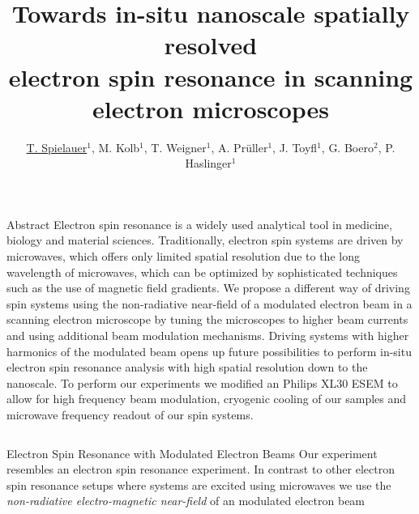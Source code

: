 \documentclass[final]{beamer}
\title{Towards in-situ nanoscale spatially resolved\hspace{1cm} \\ electron spin resonance in scanning electron microscopes}
\author{\underline{T. Spielauer$^{1}$}, M. Kolb$^{1}$, T. Weigner$^{1}$, A. Pr\"uller$^{1}$, J. Toyfl$^{1}$, G. Boero$^{2}$, P. Haslinger$^{1}$ }
\institute[]{
  {\small
  $^{1}$VCQ, Technische Universität Wien, Atominstitut, Stadionallee 2, 1020 Vienna, Austria; $^{2}$EPFL, BM 3110 Station 17, CH-1015 Lausanne, Switzerland
  }
}
\begin{document}
\begin{frame}[fragile]{}
  \begin{block}{\Large Abstract}
	Electron spin resonance is a widely used analytical tool in medicine, biology
	and material sciences. Traditionally, electron spin systems are driven by microwaves,
	which offers only limited spatial resolution due to the long wavelength of microwaves,
	which can be optimized by sophisticated techniques such as the use of magnetic
	field gradients. We propose a different way of driving spin systems using the
	non-radiative near-field of a modulated electron beam in a scanning electron microscope
	by tuning the microscopes to higher beam currents and using additional beam modulation
	mechanisms. Driving systems with higher harmonics of the modulated beam opens up
	future possibilities to perform in-situ electron spin resonance analysis with high
	spatial resolution down to the nanoscale. To perform our experiments we modified an
	Philips XL30 ESEM to allow for high frequency beam modulation, cryogenic cooling
	of our samples and microwave frequency readout of our spin systems.
  \end{block}
  \begin{columns}[T]
    \begin{column}{.49\linewidth}
	\begin{block}{\Large Electron Spin Resonance with Modulated Electron Beams}
		Our experiment resembles an electron spin resonance experiment. In contrast to
		other electron spin resonance setups where systems are excited using microwaves
		we use the \textit{non-radiative electro-magnetic near-field} of an modulated
		electron beam

		\vspace{1cm}


\end{block}
\end{column}
\end{columns}
\end{frame}
\end{document}
